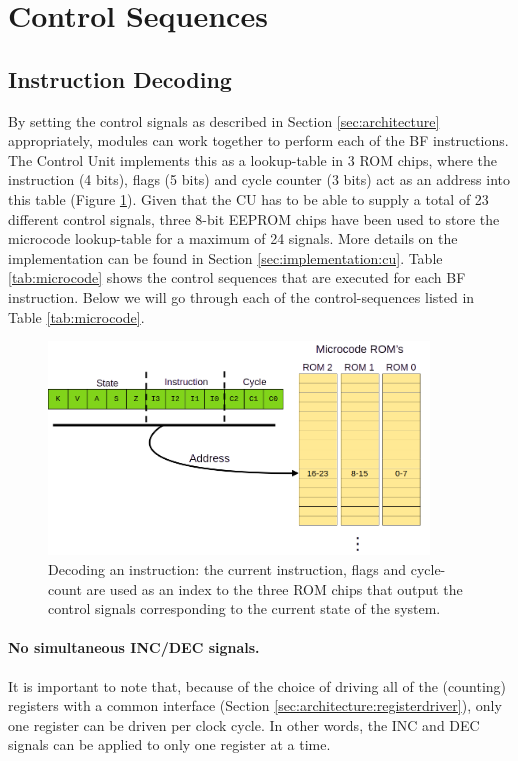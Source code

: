 \section{Control Sequences} \label{sec:sequences}
\subsection{Instruction Decoding}
By setting the control signals as described in Section \ref{sec:architecture} appropriately, modules can work together to perform each of the BF instructions. The Control Unit implements this as a lookup-table in 3 ROM chips, where the instruction (4 bits), flags (5 bits) and cycle counter (3 bits) act as an address into this table (Figure \ref{fig:decoder}). Given that the CU has to be able to supply a total of 23 different control signals, three 8-bit EEPROM chips have been used to store the microcode lookup-table for a maximum of 24 signals. More details on the implementation can be found in Section \ref{sec:implementation:cu}. Table \ref{tab:microcode} shows the control sequences that are executed for each BF instruction. Below we will go through each of the control-sequences listed in Table \ref{tab:microcode}.

\begin{figure}[h]
  \centering
  \includegraphics[width=0.9\textwidth]{img/instruction_decoding}
  \caption{Decoding an instruction: the current instruction, flags and cycle-count are used as an index to the three ROM chips that output the control signals corresponding to the current state of the system.}
  \label{fig:decoder}
\end{figure}

\paragraph{No simultaneous INC/DEC signals.} It is important to note that, because of the choice of driving all of the (counting) registers with a common interface (Section \ref{sec:architecture:registerdriver}), only one register can be driven per clock cycle. In other words, the INC and DEC signals can be applied to only one register at a time. 


